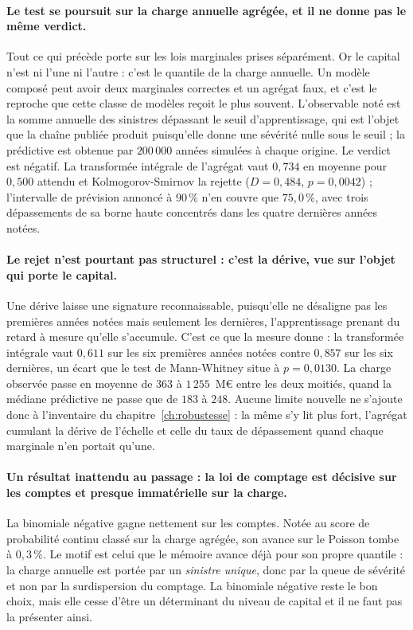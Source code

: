 \paragraph{Le test se poursuit sur la charge annuelle agrégée, et il ne donne pas le même
verdict.} Tout ce qui précède porte sur les lois marginales prises séparément. Or le capital
n'est ni l'une ni l'autre : c'est le quantile de la charge annuelle. Un modèle composé peut avoir
deux marginales correctes et un agrégat faux, et c'est le reproche que cette classe de modèles
reçoit le plus souvent. L'observable noté est la somme annuelle des sinistres dépassant le seuil
d'apprentissage, qui est l'objet que la chaîne publiée produit puisqu'elle donne une sévérité
nulle sous le seuil ; la prédictive est obtenue par $200\,000$ années simulées à chaque origine.
Le verdict est négatif. La transformée intégrale de l'agrégat vaut $0{,}734$ en moyenne pour
$0{,}500$ attendu et Kolmogorov-Smirnov la rejette ($D = 0{,}484$, $p = 0{,}0042$) ; l'intervalle
de prévision annoncé à $90\,\%$ n'en couvre que $75{,}0\,\%$, avec trois dépassements de sa borne
haute concentrés dans les quatre dernières années notées.

\paragraph{Le rejet n'est pourtant pas structurel : c'est la dérive, vue sur l'objet qui porte le
capital.} Une dérive laisse une signature reconnaissable, puisqu'elle ne désaligne pas les
premières années notées mais seulement les dernières, l'apprentissage prenant du retard à mesure
qu'elle s'accumule. C'est ce que la mesure donne : la transformée intégrale vaut $0{,}611$ sur les
six premières années notées contre $0{,}857$ sur les six dernières, un écart que le test de
Mann-Whitney situe à $p = 0{,}0130$. La charge observée passe en moyenne de $363$ à
$1\,255$~M\euro{} entre les deux moitiés, quand la médiane prédictive ne passe que de $183$ à
$248$. Aucune limite nouvelle ne s'ajoute donc à l'inventaire du
chapitre~\ref{ch:robustesse} : la même s'y lit plus fort, l'agrégat cumulant la dérive de
l'échelle et celle du taux de dépassement quand chaque marginale n'en portait qu'une.

\paragraph{Un résultat inattendu au passage : la loi de comptage est décisive sur les comptes et
presque immatérielle sur la charge.} La binomiale négative gagne nettement sur les comptes. Notée
au score de probabilité continu classé sur la charge agrégée, son avance sur le Poisson tombe à
$0{,}3\,\%$. Le motif est celui que le mémoire avance déjà pour son propre quantile : la charge
annuelle est portée par un \emph{sinistre unique}, donc par la queue de sévérité et non par la
surdispersion du comptage. La binomiale négative reste le bon choix, mais elle cesse d'être un
déterminant du niveau de capital et il ne faut pas la présenter ainsi.

